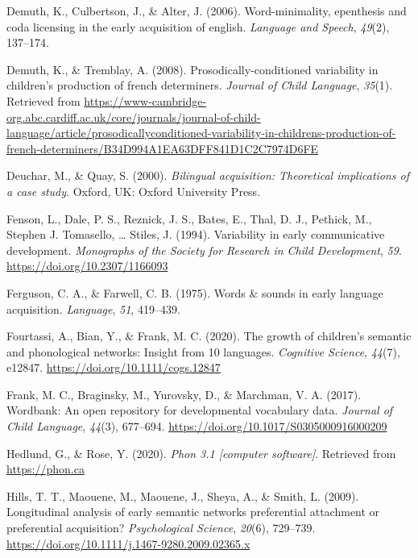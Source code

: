 \documentclass[
  english,
  man,floatsintext]{apa6}
\begin{document}
\leavevmode\hypertarget{ref-demuth_word-minimality_2006}{}%
Demuth, K., Culbertson, J., \& Alter, J. (2006). Word-minimality, epenthesis and coda licensing in the early acquisition of english. \emph{Language and Speech}, \emph{49}(2), 137--174.

\leavevmode\hypertarget{ref-demuth_katherine_prosodically-conditioned_2008}{}%
Demuth, K., \& Tremblay, A. (2008). Prosodically-conditioned variability in children's production of french determiners. \emph{Journal of Child Language}, \emph{35}(1). Retrieved from \url{https://www-cambridge-org.abc.cardiff.ac.uk/core/journals/journal-of-child-language/article/prosodicallyconditioned-variability-in-childrens-production-of-french-determiners/B34D994A1EA63DFF841D1C2C7974D6FE}

\leavevmode\hypertarget{ref-deuchar_bilingual_2000}{}%
Deuchar, M., \& Quay, S. (2000). \emph{Bilingual acquisition: Theoretical implications of a case study}. Oxford, UK: Oxford University Press.

\leavevmode\hypertarget{ref-fenson_variability_1994}{}%
Fenson, L., Dale, P. S., Reznick, J. S., Bates, E., Thal, D. J., Pethick, M., Stephen J. Tomasello, \ldots{} Stiles, J. (1994). Variability in early communicative development. \emph{Monographs of the Society for Research in Child Development}, \emph{59}. \url{https://doi.org/10.2307/1166093}

\leavevmode\hypertarget{ref-ferguson_words_1975}{}%
Ferguson, C. A., \& Farwell, C. B. (1975). Words \& sounds in early language acquisition. \emph{Language}, \emph{51}, 419--439.

\leavevmode\hypertarget{ref-fourtassi_growth_2020}{}%
Fourtassi, A., Bian, Y., \& Frank, M. C. (2020). The growth of children's semantic and phonological networks: Insight from 10 languages. \emph{Cognitive Science}, \emph{44}(7), e12847. \url{https://doi.org/10.1111/cogs.12847}

\leavevmode\hypertarget{ref-frank_wordbank_2017}{}%
Frank, M. C., Braginsky, M., Yurovsky, D., \& Marchman, V. A. (2017). Wordbank: An open repository for developmental vocabulary data. \emph{Journal of Child Language}, \emph{44}(3), 677--694. \url{https://doi.org/10.1017/S0305000916000209}

\leavevmode\hypertarget{ref-hedlund_gregory_phon_2020}{}%
Hedlund, G., \& Rose, Y. (2020). \emph{Phon 3.1 {[}computer software{]}}. Retrieved from \url{https://phon.ca}

\leavevmode\hypertarget{ref-hills_longitudinal_2009}{}%
Hills, T. T., Maouene, M., Maouene, J., Sheya, A., \& Smith, L. (2009). Longitudinal analysis of early semantic networks preferential attachment or preferential acquisition? \emph{Psychological Science}, \emph{20}(6), 729--739. \url{https://doi.org/10.1111/j.1467-9280.2009.02365.x}
\end{document}
